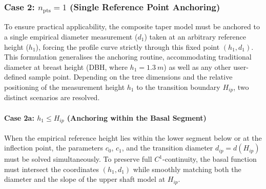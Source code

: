 \documentclass[twocolumn, bibliography=totoc]{scrartcl}
\begin{document}
\subsubsection{Case 2: $n_{\text{pts}} = 1$ (Single Reference Point Anchoring)}

To ensure practical applicability, the composite taper model must be anchored to a single empirical diameter measurement ($d_1$) taken at an arbitrary reference height ($h_1$), forcing the profile curve strictly through this fixed point $(h_1, d_1)$. This formulation generalises the anchoring routine, accommodating traditional diameter at breast height (DBH, where $h_1 = \qty{1.3}{m}$) as well as any other user-defined sample point. Depending on the tree dimensions and the relative positioning of the measurement height $h_1$ to the transition boundary $H_{ip}$, two distinct scenarios are resolved.

\paragraph{Case 2a: $h_1 \le H_{ip}$ (Anchoring within the Basal Segment)}

When the empirical reference height lies within the lower segment below or at the inflection point, the parameters $c_0$, $c_1$, and the transition diameter $d_{ip} = d(H_{ip})$ must be solved simultaneously. To preserve full $C^1$-continuity, the basal function must intersect the coordinates $(h_1, d_1)$ while smoothly matching both the diameter and the slope of the upper shaft model at $H_{ip}$. 
\end{document}
